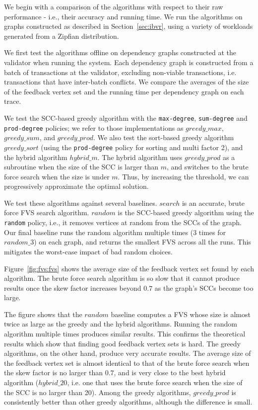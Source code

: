 We begin with a comparison of the algorithms with respect to their raw performance - i.e., their accuracy and running time. We run the algorithms on graphs constructed as described in Section~\ref{sec:ibvr}, using a variety of workloads generated from a Zipfian distribution. 

We first test the algorithms offline on dependency graphs constructed at the validator when running the system. Each dependency graph is constructed from a batch of transactions at the validator, excluding non-viable transactions, i.e. transactions that have inter-batch conflicts. We compare the averages of the size of the feedback vertex set and the running time per dependency graph on each trace.

We test the SCC-based greedy algorithm with the \texttt{max-degree}, \texttt{sum-degree} and \texttt{prod-degree} policies; we refer to those implementations as $greedy\_max$, $greedy\_sum$, and $greedy\_prod$. We also test the sort-based greedy algorithm $greedy\_sort$ (using the \texttt{prod-degree} policy for sorting and multi factor 2), and the hybrid algorithm $hybrid\_m$. The hybrid algorithm uses $greedy\_prod$ as a subroutine when the size of the SCC is larger than $m$, and switches to the brute force search when the size is under $m$. Thus, by increasing the threshold, we can progressively approximate the optimal solution. 


We test these algorithms against several baselines. $search$ is an accurate, brute force FVS search algorithm. $random$ is the SCC-based greedy algorithm using the \texttt{random} policy, i.e., it removes vertices at random from the SCCs of the graph. Our final baseline runs the random algorithm multiple times (3 times for $random\_3$) on each graph, and returns the smallest FVS across all the runs. This mitigates the worst-case impact of bad random choices.



Figure~\ref{fig:fvs:fvs} shows the average size of the feedback vertex set found by each algorithm. The brute force search algorithm is so slow that it cannot produce results once the skew factor increases beyond $0.7$ as the graph's SCCs become too large.


The figure shows that the $random$ baseline computes a FVS whose size is almost twice as large as the greedy and the hybrid algorithms. Running the random algorithm multiple times produces similar results. This confirms the theoretical results which show that finding good feedback vertex sets is hard. The greedy algorithms, on the other hand, produce very accurate results. The average size of the feedback vertex set is almost identical to that of the brute force search when the skew factor is no larger than $0.7$, and is very close to the best hybrid algorithm ($hybrid\_20$, i.e. one that uses the brute force search when the size of the SCC is no larger than 20). Among the greedy algorithms, $greedy\_prod$ is consistently better than other greedy algorithms, although the difference is small.

